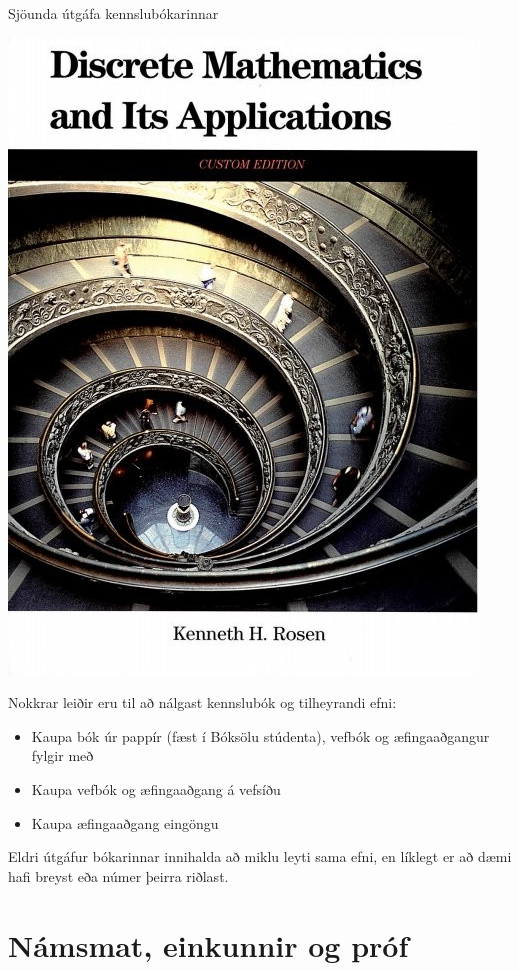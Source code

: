 \documentclass[justified, nobib]{tufte-handout}
\begin{document}
\begin{marginfigure}
    \caption{Sjöunda útgáfa kennslubókarinnar}
    \includegraphics[width=\linewidth]{Pics/rosen}
\end{marginfigure}

Nokkrar leiðir eru til að nálgast kennslubók og tilheyrandi efni:
\begin{itemize}
    \item Kaupa bók úr pappír (fæst í Bóksölu stúdenta), vefbók og æfingaaðgangur fylgir með
    \item Kaupa vefbók og æfingaaðgang á vefsíðu
    \item Kaupa æfingaaðgang eingöngu
\end{itemize}
Eldri útgáfur bókarinnar innihalda að miklu leyti sama efni, en líklegt er að dæmi hafi breyst eða númer þeirra riðlast.

\section{Námsmat, einkunnir og próf}
\end{document}

